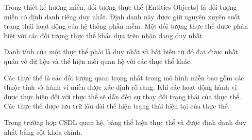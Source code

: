 Trong thiết kế hướng miền, đối tượng thực thể (Entities Objects) là đối tượng miền có định danh riêng duy nhất. Định danh này được giữ nguyên xuyên suốt trạng thái hoạt động của hệ thống phần mềm. Một đối tượng thực thể được phân biệt với các đối tượng thực thể khác dựa trên nhận dạng duy nhất.

Danh tính của một thực thể phải là duy nhất và bất biến từ đó đạt được nhất quán về dữ liệu và thể hiện mối quan hệ với các thực thể khác.

Các thực thể là các đối tượng quan trọng nhất trong mô hình miền bao gồm các thuộc tính và hành vi miền được xác định rõ ràng. Khi các hoạt động hành vi được thực hiện đối với thực thể sẽ dẫn đến sự thay đổi trạng thái của thực thể. Các thực thể được lưu trữ lâu dài thể hiện trạng thái hiện tại của thực thể.

\begin{example} Trong trường hợp CSDL quan hệ, bảng thể hiện thực thể và được định danh duy nhất bằng cột khóa chính.

\end{example}